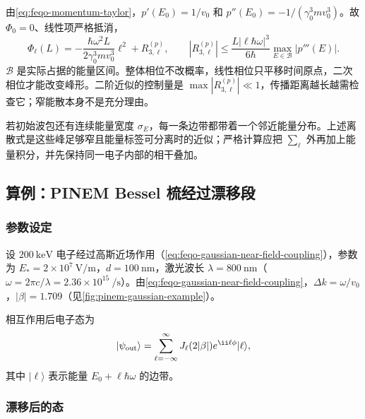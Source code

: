 由\cref{eq:feqo-momentum-taylor}，$p'(E_0)=1/v_0$ 和 $p''(E_0)=-1/(\gamma_0^3mv_0^3)$。故 $\Phi_0=0$、线性项严格抵消，
\begin{equation}
\Phi_\ell(L)=-\frac{\hbar\omega^2L}{2\gamma_0^3mv_0^3}\ell^2
+R_{3,\ell}^{(p)},\qquad
|R_{3,\ell}^{(p)}|\leq\frac{L|\ell\hbar\omega|^3}{6\hbar}
\max_{E\in\mathcal{B}}|p'''(E)|.
\label{eq:feqo-sideband-phase-expansion}
\end{equation}
$\mathcal{B}$ 是实际占据的能量区间。整体相位不改概率，线性相位只平移时间原点，二次相位才能改变峰形。二阶近似的控制量是 $\max|R_{3,\ell}^{(p)}|\ll 1$，传播距离越长越需检查它；窄能散本身不是充分理由。

若初始波包还有连续能量宽度 $\sigma_E$，每一条边带都带着一个邻近能量分布。上述离散式是这些峰足够窄且能量标签可分离时的近似；严格计算应把 $\sum_\ell$ 外再加上能量积分，并先保持同一电子内部的相干叠加。

\subsection{算例：PINEM Bessel 梳经过漂移段}

\subsubsection{参数设定}

设 $200\ \si{\kilo\electronvolt}$ 电子经过高斯近场作用（\cref{eq:feqo-gaussian-near-field-coupling}），参数为 $E_*=2\times10^7\ \si{\volt\per\metre}$，$d=100\ \si{\nano\metre}$，激光波长 $\lambda=800\ \si{\nano\metre}$（$\omega=2\pi c/\lambda=2.36\times10^{15}\ \si{\per\second}$）。由\cref{eq:feqo-gaussian-near-field-coupling}，$\Delta k=\omega/v_0$，$|\beta|=1.709$（见\cref{fig:pinem-gaussian-example}）。

相互作用后电子态为
\begin{equation}
|\psi_{\rm out}\rangle=\sum_{\ell=-\infty}^{\infty}J_\ell(2|\beta|)e^{\ii\ell\phi}|\ell\rangle,
\label{eq:feqo-pinem-comb-state}
\end{equation}
其中 $|\ell\rangle$ 表示能量 $E_0+\ell\hbar\omega$ 的边带。

\subsubsection{漂移后的态}


